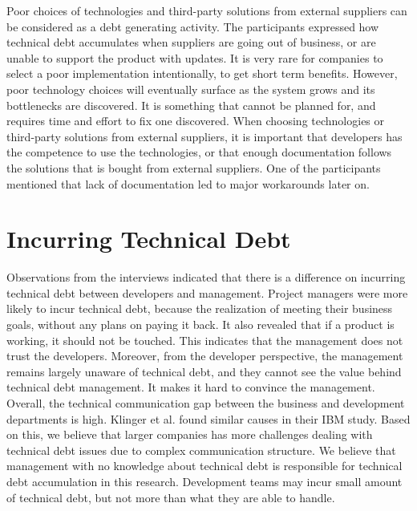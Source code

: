 Poor choices of technologies and third-party solutions from external suppliers can be considered as a debt generating activity. The participants expressed how technical debt accumulates when suppliers are going out of business, or are unable to support the product with updates. It is very rare for companies to select a poor implementation intentionally, to get short term benefits. However, poor technology choices will eventually surface as the system grows and its bottlenecks are discovered. It is something that cannot be planned for, and requires time and effort to fix one discovered. When choosing technologies or third-party solutions from external suppliers, it is important that developers has the competence to use the technologies, or that enough documentation follows the solutions that is bought from external suppliers. One of the participants mentioned that lack of documentation led to major workarounds later on.

\section{Incurring Technical Debt}
Observations from the interviews indicated that there is a difference on incurring technical debt between developers and management. Project managers were more likely to incur technical debt, because the realization of meeting their business goals, without any plans on paying it back. It also revealed that if a product is working, it should not be touched. This indicates that the management does not trust the developers. Moreover, from the developer perspective, the management remains largely unaware of technical debt, and they cannot see the value behind technical debt management. It makes it hard to convince the management. Overall, the technical communication gap between the business and development departments is high. Klinger et al.\cite{p35-klinger} found similar causes in their IBM study. Based on this, we believe that larger companies has more challenges dealing with technical debt issues due to complex communication structure. We believe that management with no knowledge about technical debt is responsible for technical debt accumulation in this research. Development teams may incur small amount of technical debt, but not more than what they are able to handle.

